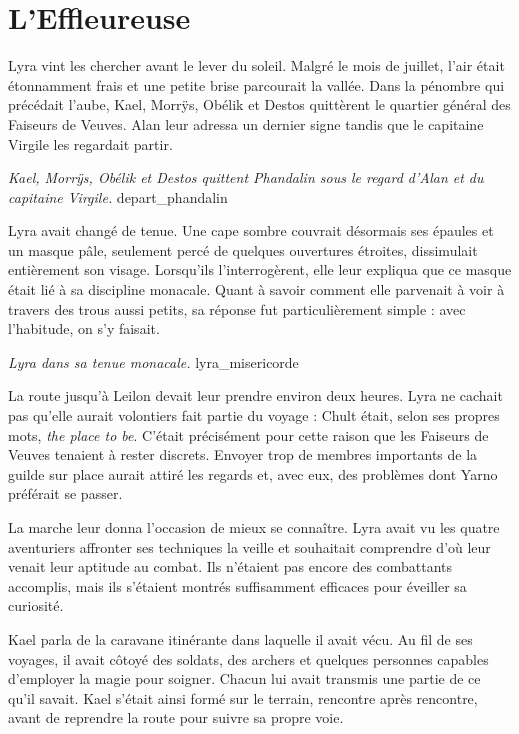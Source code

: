 \chapter{L'Effleureuse}

Lyra vint les chercher avant le lever du soleil. Malgré le mois de juillet, l'air était étonnamment frais et une petite brise parcourait la vallée. Dans la pénombre qui précédait l'aube, Kael, Morrÿs, Obélik et Destos quittèrent le quartier général des Faiseurs de Veuves. Alan leur adressa un dernier signe tandis que le capitaine Virgile les regardait partir.

{\textit{Kael, Morrÿs, Obélik et Destos quittent Phandalin sous le regard d'Alan et du capitaine Virgile.}}
{depart_phandalin}

Lyra avait changé de tenue. Une cape sombre couvrait désormais ses épaules et un masque pâle, seulement percé de quelques ouvertures étroites, dissimulait entièrement son visage. Lorsqu'ils l'interrogèrent, elle leur expliqua que ce masque était lié à sa discipline monacale. Quant à savoir comment elle parvenait à voir à travers des trous aussi petits, sa réponse fut particulièrement simple : avec l'habitude, on s'y faisait.

{\textit{Lyra dans sa tenue monacale.}}
{lyra_misericorde}

La route jusqu'à Leilon devait leur prendre environ deux heures. Lyra ne cachait pas qu'elle aurait volontiers fait partie du voyage : Chult était, selon ses propres mots, \textit{the place to be}. C'était précisément pour cette raison que les Faiseurs de Veuves tenaient à rester discrets. Envoyer trop de membres importants de la guilde sur place aurait attiré les regards et, avec eux, des problèmes dont Yarno préférait se passer.

La marche leur donna l'occasion de mieux se connaître. Lyra avait vu les quatre aventuriers affronter ses techniques la veille et souhaitait comprendre d'où leur venait leur aptitude au combat. Ils n'étaient pas encore des combattants accomplis, mais ils s'étaient montrés suffisamment efficaces pour éveiller sa curiosité.

Kael parla de la caravane itinérante dans laquelle il avait vécu. Au fil de ses voyages, il avait côtoyé des soldats, des archers et quelques personnes capables d'employer la magie pour soigner. Chacun lui avait transmis une partie de ce qu'il savait. Kael s'était ainsi formé sur le terrain, rencontre après rencontre, avant de reprendre la route pour suivre sa propre voie.


